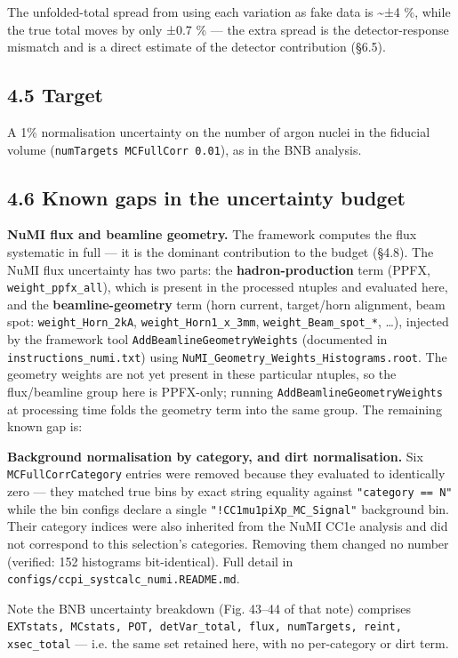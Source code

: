 \documentclass[11pt]{article}
\begin{document}
The unfolded-total spread from using each variation as fake data is \textasciitilde{}±4 \%, while the true total moves by only ±0.7 \% — the extra spread is the detector-response mismatch and is a direct estimate of the detector contribution (§6.5).

\subsection*{4.5 Target}

A 1\% normalisation uncertainty on the number of argon nuclei in the fiducial volume (\texttt{numTargets MCFullCorr 0.01}), as in the BNB analysis.

\subsection*{4.6 Known gaps in the uncertainty budget}

\textbf{NuMI flux and beamline geometry.} The framework computes the flux systematic in full — it is the dominant contribution to the budget (§4.8). The NuMI flux uncertainty has two parts: the \textbf{hadron-production} term (PPFX, \texttt{weight\_ppfx\_all}), which is present in the processed ntuples and evaluated here, and the \textbf{beamline-geometry} term (horn current, target/horn alignment, beam spot: \texttt{weight\_Horn\_2kA}, \texttt{weight\_Horn1\_x\_3mm}, \texttt{weight\_Beam\_spot\_*}, …), injected by the framework tool \texttt{AddBeamlineGeometryWeights} (documented in \texttt{instructions\_numi.txt}) using \texttt{NuMI\_Geometry\_Weights\_Histograms.root}. The geometry weights are not yet present in these particular ntuples, so the flux/beamline group here is PPFX-only; running \texttt{AddBeamlineGeometryWeights} at processing time folds the geometry term into the same group. The remaining known gap is:

\textbf{Background normalisation by category, and dirt normalisation.} Six \texttt{MCFullCorrCategory} entries were removed because they evaluated to identically zero — they matched true bins by exact string equality against \texttt{"category == N"} while the bin configs declare a single \texttt{"!CC1mu1piXp\_MC\_Signal"} background bin. Their category indices were also inherited from the NuMI CC1e analysis and did not correspond to this selection's categories. Removing them changed no number (verified: 152 histograms bit-identical). Full detail in \texttt{configs/ccpi\_systcalc\_numi.README.md}.

Note the BNB uncertainty breakdown (Fig. 43–44 of that note) comprises \texttt{EXTstats, MCstats, POT, detVar\_total, flux, numTargets, reint, xsec\_total} — i.e. the same set retained here, with no per-category or dirt term.
\end{document}
